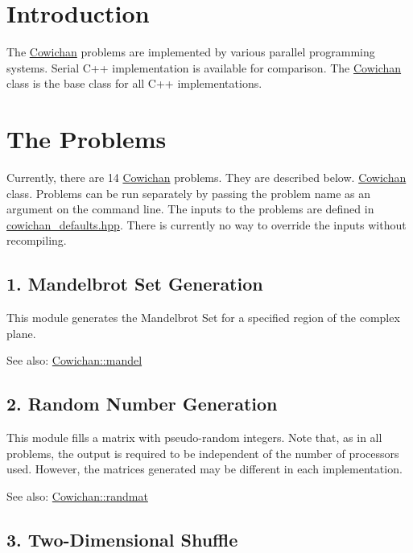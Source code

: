 \hypertarget{index_intro_sec}{}\section{Introduction}\label{index_intro_sec}
The \hyperlink{class_cowichan}{Cowichan} problems are implemented by various parallel programming systems. Serial C++ implementation is available for comparison. The \hyperlink{class_cowichan}{Cowichan} class is the base class for all C++ implementations.\hypertarget{index_problems_sec}{}\section{The Problems}\label{index_problems_sec}
Currently, there are 14 \hyperlink{class_cowichan}{Cowichan} problems. They are described below. \hyperlink{class_cowichan}{Cowichan} class. Problems can be run separately by passing the problem name as an argument on the command line. The inputs to the problems are defined in \hyperlink{cowichan__defaults_8hpp}{cowichan\_\-defaults.hpp}. There is currently no way to override the inputs without recompiling.\hypertarget{index_mandel_sec}{}\subsection{1. Mandelbrot Set Generation}\label{index_mandel_sec}
This module generates the Mandelbrot Set for a specified region of the complex plane. \begin{Desc}
\item[See also:]\hyperlink{class_cowichan_ec6cc4eb2ad444474b923532167e98a2}{Cowichan::mandel}\end{Desc}
\hypertarget{index_randmat_sec}{}\subsection{2. Random Number Generation}\label{index_randmat_sec}
This module fills a matrix with pseudo-random integers. Note that, as in all problems, the output is required to be independent of the number of processors used. However, the matrices generated may be different in each implementation. \begin{Desc}
\item[See also:]\hyperlink{class_cowichan_c44cacf9d9e363a5b076bcee8b9a7a73}{Cowichan::randmat}\end{Desc}
\hypertarget{index_half_sec}{}\subsection{3. Two-Dimensional Shuffle}\label{index_half_sec}
